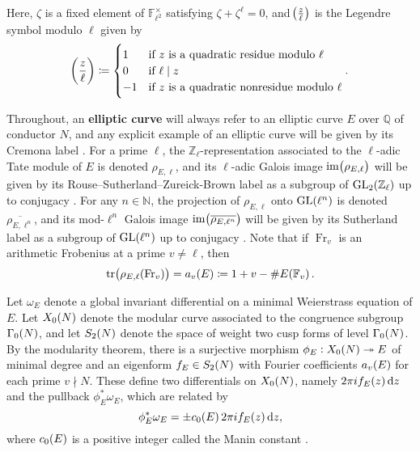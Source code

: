 \documentclass{article}
\theoremstyle{plain}
\theoremstyle{definition}
\renewcommand{\d}{\dif}
\newcommand{\FF}{\mathbb{F}}
\newcommand{\Fr}{\operatorname{Fr}}
\newcommand{\GL}{\operatorname{GL}}
\newcommand{\im}{\operatorname{im}}
\newcommand{\NN}{\mathbb{N}}
\newcommand{\QQ}{\mathbb{Q}}
\newcommand{\tr}{\operatorname{tr}}
\newcommand{\ZZ}{\mathbb{Z}}
\newcommand{\br}{\!\del}
\begin{document}
Here, $ \zeta $ is a fixed element of $ \FF_{\ell^2}^\times $ satisfying $ \zeta + \zeta^\ell = 0 $, and $ \br{\tfrac{z}{\ell}} $ is the Legendre symbol modulo $ \ell $ given by
$$ \br{\dfrac{z}{\ell}} \coloneqq
\begin{cases}
1 & \text{if} \ z \ \text{is a quadratic residue modulo} \ \ell \\
0 & \text{if} \ \ell \mid z \\
-1 & \text{if} \ z \ \text{is a quadratic nonresidue modulo} \ \ell
\end{cases}.
$$

Throughout, an \textbf{elliptic curve} will always refer to an elliptic curve $ E $ over $ \QQ $ of conductor $ N $, and any explicit example of an elliptic curve will be given by its Cremona label \cite[Table 1]{Cre92}. For a prime $ \ell $, the $ \ZZ_\ell $-representation associated to the $ \ell $-adic Tate module of $ E $ is denoted $ \rho_{E, \ell} $, and its $ \ell $-adic Galois image $ \im\br{\rho_{E, \ell}} $ will be given by its Rouse--Sutherland--Zureick-Brown label as a subgroup of $ \GL_2\br{\ZZ_\ell} $ up to conjugacy \cite[Section 2.4]{RSZB22}. For any $ n \in \NN $, the projection of $ \rho_{E, \ell} $ onto $ \GL\br{\ell^n} $ is denoted $ \overline{\rho_{E, \ell^n}} $, and its mod-$ \ell^n $ Galois image $ \im\br{\overline{\rho_{E, \ell^n}}} $ will be given by its Sutherland label as a subgroup of $ \GL\br{\ell^n} $ up to conjugacy \cite[Section 6.4]{Sut16}. Note that if $ \Fr_v $ is an arithmetic Frobenius at a prime $ v \ne \ell $, then
$$ \tr\br[1]{\rho_{E, \ell}\br{\Fr_v}} = a_v\br{E} \coloneqq 1 + v - \#E\br{\FF_v}. $$

Let $ \omega_E $ denote a global invariant differential on a minimal Weierstrass equation of $ E $. Let $ X_0\br{N} $ denote the modular curve associated to the congruence subgroup $ \Gamma_0\br{N} $, and let $ S_2\br{N} $ denote the space of weight two cusp forms of level $ \Gamma_0\br{N} $. By the modularity theorem, there is a surjective morphism $ \phi_E : X_0\br{N} \twoheadrightarrow E $ of minimal degree and an eigenform $ f_E \in S_2\br{N} $ with Fourier coefficients $ a_v\br{E} $ for each prime $ v \nmid N $. These define two differentials on $ X_0\br{N} $, namely $ 2\pi if_E\br{z}\d z $ and the pullback $ \phi_E^*\omega_E $, which are related by
$$ \phi_E^*\omega_E = \pm c_0\br{E}2\pi if_E\br{z}\d z, $$
where $ c_0\br{E} $ is a positive integer called the Manin constant \cite[Proposition 2]{Edi91}.

\pagebreak
\end{document}
